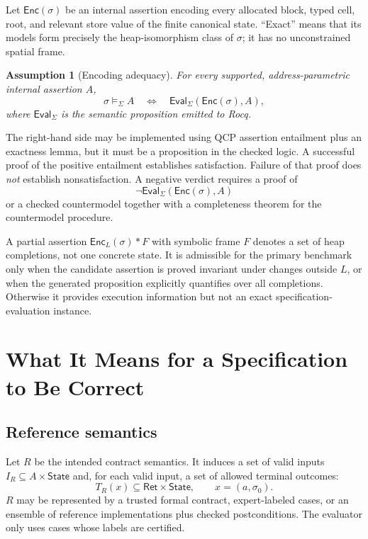 \documentclass[10pt]{article}
\newtheorem{assumption}{Assumption}
\newcommand{\rocq}{Rocq}
\newcommand{\State}{\mathsf{State}}
\newcommand{\Ret}{\mathsf{Ret}}
\newcommand{\sat}{\models}
\newcommand{\ctx}{\Sigma}
\begin{document}
Let $\mathsf{Enc}(\sigma)$ be an internal assertion encoding every allocated
block, typed cell, root, and relevant store value of the finite canonical
state.  ``Exact'' means that its models form precisely the heap-isomorphism
class of $\sigma$; it has no unconstrained spatial frame.

\begin{assumption}[Encoding adequacy]
For every supported, address-parametric internal assertion $A$,
\[
  \sigma\sat_{\ctx} A
  \quad\Longleftrightarrow\quad
  \mathsf{Eval}_{\ctx}(\mathsf{Enc}(\sigma),A),
\]
where $\mathsf{Eval}_{\ctx}$ is the semantic proposition emitted to \rocq{}.
\end{assumption}

The right-hand side may be implemented using QCP assertion entailment plus an
exactness lemma, but it must be a proposition in the checked logic.  A
successful proof of the positive entailment establishes satisfaction.  Failure
of that proof does \emph{not} establish nonsatisfaction.  A negative verdict
requires a proof of
\[
  \neg\mathsf{Eval}_{\ctx}(\mathsf{Enc}(\sigma),A)
\]
or a checked countermodel together with a completeness theorem for the
countermodel procedure.

A partial assertion $\mathsf{Enc}_L(\sigma)*F$ with symbolic frame $F$ denotes
a set of heap completions, not one concrete state.  It is admissible for the
primary benchmark only when the candidate assertion is proved invariant under
changes outside $L$, or when the generated proposition explicitly quantifies
over all completions.  Otherwise it provides execution information but not an
exact specification-evaluation instance.

\section{What It Means for a Specification to Be Correct}
\label{sec:quality}

\subsection{Reference semantics}

Let $R$ be the intended contract semantics.  It induces a set of valid inputs
$I_R\subseteq A\times\State$ and, for each valid input, a set of allowed
terminal outcomes:
\[
  T_R(x)\subseteq \Ret\times\State,\qquad x=(a,\sigma_0).
\]
$R$ may be represented by a trusted formal contract, expert-labeled cases, or
an ensemble of reference implementations plus checked postconditions.  The
evaluator only uses cases whose labels are certified.
\end{document}
